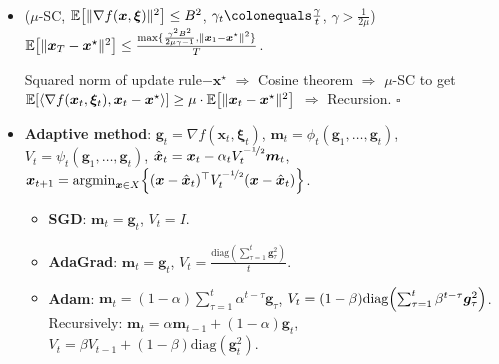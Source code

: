 \documentclass[8pt,a4paper]{extarticle}
\renewcommand{\proof}[1]{\begin{tcolorbox}#1 \hfill $\square$\end{tcolorbox}}
\DeclareMathOperator*{\argmin}{argmin}
\newcommand{\lft}{\mathopen{}\mathclose\bgroup\left}
\newcommand{\rgt}{\aftergroup\egroup\right}
\newcommand{\E}{\mathbb{E}}
\renewcommand{\vec}[1]{\bm{#1}}
\newcommand{\mat}[1]{#1}
\newenvironment{topic}[1]
{\textbf{\sffamily \colorbox{black}{\rlap{\textbf{\textcolor{white}{#1}}}\hspace{\linewidth}\hspace{-2\fboxsep}}} \\ \vspace{0.2cm}}
{}
\begin{document}
\begin{multicols*}{2}
\begin{topic}{Stochastic optimization}
\begin{itemize}
            \item ($\mu$-SC, $\E \lft[ \| \nabla f(\vec{x}, \vec{\xi}) \|^2 \rgt] \leq B^2$, $\gamma_t \colonequals \frac{\gamma}{t}$, $\gamma > \frac{1}{2 \mu}$)\\
                  $\E \lft[ \| \vec{x}_T - \vec{x}^\star \|^2 \rgt] \leq \frac{\max \{ \frac{\gamma^2 B^2}{2 \mu \gamma - 1}, \| \vec{x}_1 - \vec{x}^\star \|^2 \}}{T}$.
                  \proof{Squared norm of update rule$-\vec{x}^\star$ $\Rightarrow$ Cosine theorem $\Rightarrow$ $\mu$-SC to get $\E \lft[ \langle \nabla f(\vec{x}_t, \vec{\xi}_t), \vec{x}_t - \vec{x}^\star \rangle \rgt] \geq \mu \cdot \E \lft[ \| \vec{x}_t - \vec{x}^\star \|^2 \rgt]$ $\Rightarrow$ Recursion.}
            \item \textbf{Adaptive method}: $\vec{g}_t = \nabla f(\vec{x}_t, \vec{\xi}_t)$, $\vec{m}_t = \phi_t(\vec{g}_1, \ldots, \vec{g}_t)$, $\mat{V}_t = \psi_t(\vec{g}_1, \ldots, \vec{g}_t)$, $\hat{\vec{x}}_t = \vec{x}_t - \alpha_t \mat{V}_t^{-\nicefrac{1}{2}} \vec{m}_t$, $\vec{x}_{t+1} = \argmin_{\vec{x} \in X} \lft\{ (\vec{x} - \hat{\vec{x}}_t)^\top \mat{V}_t^{-\nicefrac{1}{2}}(\vec{x} - \hat{\vec{x}}_t) \rgt\}$.
                  \begin{itemize}
                      \item \textbf{SGD}: $\vec{m}_t = \vec{g}_t$, $\mat{V}_t = \mat{I}$.
                      \item \textbf{AdaGrad}: $\vec{m}_t = \vec{g}_t$, $\mat{V}_t = \frac{\mathrm{diag}(\sum_{\tau=1}^{t} \vec{g}_{\tau}^2)}{t}$.
                      \item \textbf{Adam}: $\vec{m}_t = (1-\alpha) \sum_{\tau=1}^{t} \alpha^{t-\tau} \vec{g}_{\tau}$, $\mat{V}_t = (1-\beta) \mathrm{diag} \lft( \sum_{\tau=1}^{t} \beta^{t-\tau} \vec{g}_{\tau}^2 \rgt)$.
                            Recursively: $\vec{m}_t = \alpha \vec{m}_{t-1} + (1-\alpha) \vec{g}_t$, $\mat{V}_t = \beta \mat{V}_{t-1} + (1-\beta)\mathrm{diag}(\vec{g}_t^2)$.
                  \end{itemize}
        \end{itemize}
    \end{topic}


\end{multicols*}
\end{document}
